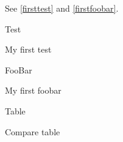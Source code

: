 \documentclass{article}
\begin{document}
\listoftests
{}


See \ref{firsttest} and \ref{firstfoobar}.

\lipsum
\begin{test}
    \centering
    \mbox{\Huge Test}
    \caption{My first test}\label{firsttest}
\end{test}
\begin{foobar}
    \centering
    \mbox{\Huge FooBar}
    \caption{My first foobar}\label{firstfoobar}
\end{foobar}
\begin{table}
    \centering
    \mbox{\Huge Table}
    \caption{Compare table}
\end{table}
\lipsum
\end{document}
